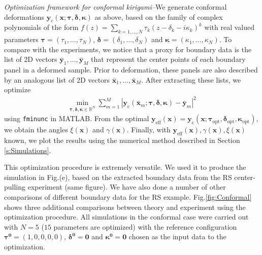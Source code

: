 \documentclass[aps,11pt,tightenlines,notitlepage,superscriptaddress,longbibliography,nofootinbib]{revtex4-1}
\begin{document}
\textit{Optimization framework for conformal kirigami\;--\;}We generate conformal deformations $\mathbf{y}_{c}(\mathbf{x}; \boldsymbol{\tau}, \boldsymbol{\delta}, \boldsymbol{\kappa})$ as above, based on the family of complex polynomials of the form $f(z) = \sum_{k =1,\ldots, N} \tau_{k} (z - \delta_k  - i \kappa_k)^k$ with real valued parameters $\boldsymbol{\tau} = (\tau_1, \ldots, \tau_N)$, $\boldsymbol{\delta} = (\delta_1, \ldots, \delta_N)$ and $\boldsymbol{\kappa} = (\kappa_1, \ldots, \kappa_N)$.  To compare with the experiments, we notice that a proxy for boundary data is the list of 2D vectors $\bar{\mathbf{y}}_{1}, \ldots, \bar{\mathbf{y}}_{M}$ that represent the center points of each boundary panel in a deformed sample. Prior to deformation, these panels are also described by an analogous list of 2D vectors  $\bar{\mathbf{x}}_1, \ldots, \bar{\mathbf{x}}_M$. After extracting these lists, we optimize 
\begin{equation}
\begin{aligned}
\min_{\boldsymbol{\tau}, \boldsymbol{\delta}, \boldsymbol{\kappa}  \in \mathbb{R}^{N}} \sum_{m = 1}^{M} | \mathbf{y}_{\text{c}}(\bar{\mathbf{x}}_m; \boldsymbol{\tau},\boldsymbol{\delta}, \boldsymbol{\kappa}) -  \bar{\mathbf{y}}_{m}|^2
\end{aligned}
\end{equation}
 using \verb+fminunc+ in MATLAB. From the optimal $\mathbf{y}_{\text{eff}}(\mathbf{x}) =  \mathbf{y}_{\text{c}}(\mathbf{x}; \boldsymbol{\tau}_{\text{opt}}, \boldsymbol{\delta}_{\text{opt}}, \boldsymbol{\kappa}_{\text{opt}})$, we obtain the angles $\xi(\mathbf{x})$ and $\gamma(\mathbf{x})$. Finally, with $\mathbf{y}_{\text{eff}}(\mathbf{x}), \gamma(\mathbf{x}), \xi(\mathbf{x})$ known, we plot the results using the numerical method described in Section \ref{s:Simulations}.

This optimization procedure is extremely versatile. We used it to produce the simulation in Fig.(e), based on the extracted boundary data from the RS center-pulling experiment (same figure). We have also done a number of other comparisons of different boundary data for the RS example. Fig.\;\ref{fig:Conformal} shows three additional comparisons between theory and experiment using the optimization procedure. All simulations in the conformal case were carried out with $N = 5$ ($15$ parameters are optimized) with the reference configuration  $\boldsymbol{\tau^0} = (1,0,0,0,0)$, $\boldsymbol{\delta^0} = \boldsymbol{0}$ and $\boldsymbol{\kappa^0} = \boldsymbol{0}$ chosen as the input data to the optimization.
\end{document}
